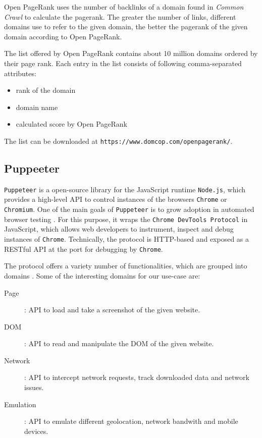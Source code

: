 Open PageRank uses the number of backlinks of a domain found in \textit{Common Crawl} to calculate the pagerank. The greater the number of links, different domains use to refer to the given domain, the better the pagerank of the given domain according to Open PageRank.

The list offered by Open PageRank contains about 10 million domains ordered by their page rank. Each entry in the list consists of following comma-separated attributes:

\begin{itemize}
	\item rank of the domain
	\item domain name
	\item calculated score by Open PageRank
\end{itemize}

The list can be downloaded at \texttt{https://www.domcop.com/openpagerank/}.

\subsection{Puppeeter}
\label{puppeeter}
\texttt{Puppeteer} is a open-source library for the JavaScript runtime \texttt{Node.js}, which provides a high-level API to control instances of the browsers \texttt{Chrome} or \texttt{Chromium}. One of the main goals of \texttt{Puppeteer} is to grow adoption in automated browser testing \cite{PuppeteerFAQ}.  For this purpose, it wraps the \texttt{Chrome DevTools Protocol} in JavaScript, which allows web developers to instrument, inspect and debug instances of \texttt{Chrome}. Technically, the protocol is HTTP-based and exposed as a RESTful API at the port for debugging by \texttt{Chrome}.

The protocol offers a variety number of functionalities, which are grouped into domains \cite{DevToolsProtocol}. Some of the interesting domains for our use-case are:
\begin{description}
	\item[Page]: API to load and take a screenshot of the given website.
	\item[DOM]: API to read and manipulate the DOM of the given website.
	\item[Network]: API to intercept network requests, track downloaded data and network issues.
	\item[Emulation]: API to emulate different geolocation, network bandwith and mobile devices.
\end{description}


